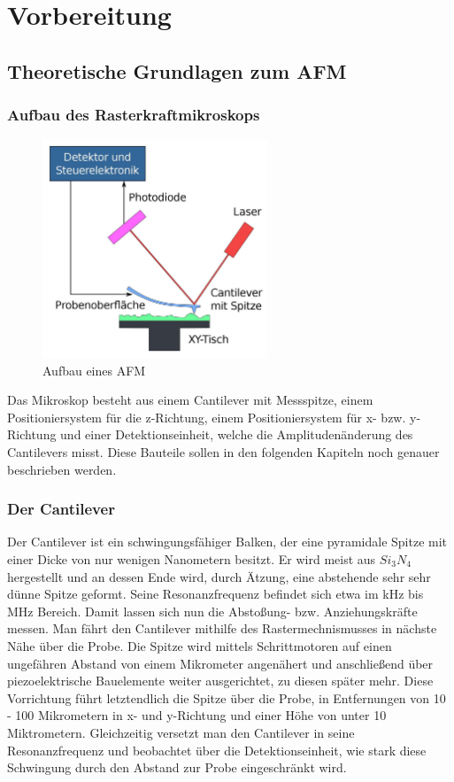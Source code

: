 \chapter{Vorbereitung}

\section{Theoretische Grundlagen zum AFM}
       
 \subsection{Aufbau des Rasterkraftmikroskops}
\begin{figure}[h!]
    \centering
    \includegraphics[width=0.6\textwidth]{Abb/afm.jpg}
    \caption{Aufbau eines AFM}
    \label{afm}
\end{figure}

Das Mikroskop besteht aus einem Cantilever mit Messspitze, einem Positioniersystem für die z-Richtung, einem Positioniersystem für x- bzw. y-Richtung und einer Detektionseinheit, welche die Amplitudenänderung des Cantilevers misst. 
Diese Bauteile sollen in den folgenden Kapiteln noch genauer beschrieben werden. 

 \subsection{Der Cantilever}
 
Der Cantilever ist ein schwingungsfähiger Balken, der eine pyramidale Spitze mit einer Dicke von nur wenigen Nanometern besitzt.
Er wird meist aus $Si_3N_4$ hergestellt und an dessen Ende wird, durch Ätzung, eine abstehende sehr sehr dünne Spitze geformt.
Seine Resonanzfrequenz befindet sich etwa im kHz bis MHz Bereich.
Damit lassen sich nun die Abstoßung- bzw. Anziehungskräfte messen.
Man fährt den Cantilever mithilfe des Rastermechnismusses in nächste Nähe über die Probe.
Die Spitze wird mittels Schrittmotoren auf einen ungefähren Abstand von einem Mikrometer angenähert und anschließend über piezoelektrische Bauelemente weiter ausgerichtet, zu diesen später mehr.
Diese Vorrichtung führt letztendlich die Spitze über die Probe, in Entfernungen von 10 - 100 Mikrometern in x- und y-Richtung und einer Höhe von unter 10 Miktrometern.
Gleichzeitig versetzt man den Cantilever in seine Resonanzfrequenz und beobachtet über die Detektionseinheit, wie stark diese Schwingung durch den Abstand zur Probe eingeschränkt wird.

